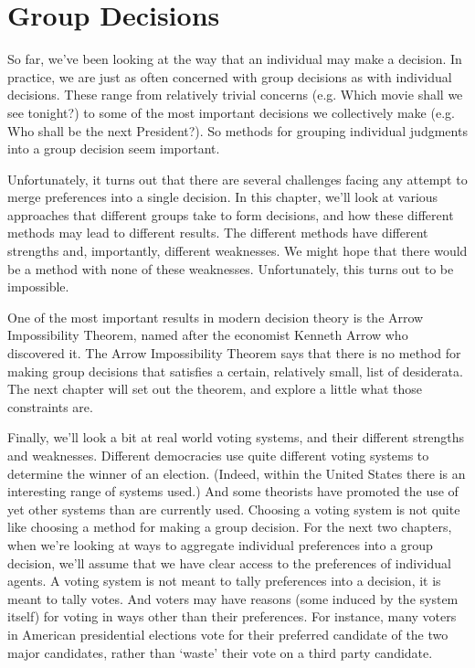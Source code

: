\chapter{Group Decisions}

So far, we've been looking at the way that an individual may make a decision. In practice, we are just as often concerned with group decisions as with individual decisions. These range from relatively trivial concerns (e.g. Which movie shall we see tonight?) to some of the most important decisions we collectively make (e.g. Who shall be the next President?). So methods for grouping individual judgments into a group decision seem important.

Unfortunately, it turns out that there are several challenges facing any attempt to merge preferences into a single decision. In this chapter, we'll look at various approaches that different groups take to form decisions, and how these different methods may lead to different results. The different methods have different strengths and, importantly, different weaknesses. We might hope that there would be a method with none of these weaknesses. Unfortunately, this turns out to be impossible. 

One of the most important results in modern decision theory is the Arrow Impossibility Theorem, named after the economist Kenneth Arrow who discovered it. The Arrow Impossibility Theorem says that there is no method for making group decisions that satisfies a certain, relatively small, list of desiderata. The next chapter will set out the theorem, and explore a little what those constraints are.

Finally, we'll look a bit at real world voting systems, and their different strengths and weaknesses. Different democracies use quite different voting systems to determine the winner of an election. (Indeed, within the United States there is an interesting range of systems used.) And some theorists have promoted the use of yet other systems than are currently used. Choosing a voting system is not quite like choosing a method for making a group decision. For the next two chapters, when we're looking at ways to aggregate individual preferences into a group decision, we'll assume that we have clear access to the preferences of individual agents. A voting system is not meant to tally preferences into a decision, it is meant to tally votes. And voters may have reasons (some induced by the system itself) for voting in ways other than their preferences. For instance, many voters in American presidential elections vote for their preferred candidate of the two major candidates, rather than `waste' their vote on a third party candidate.


